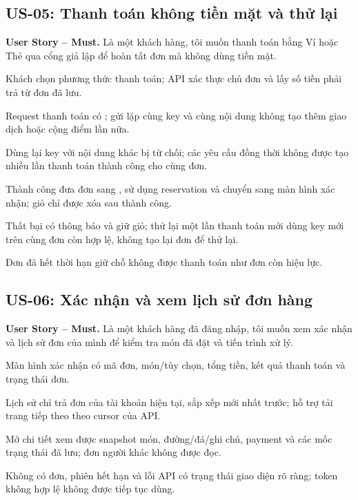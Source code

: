 \subsection{US-05: Thanh toán không tiền mặt và thử lại}
\label{us:05}
\noindent\textbf{User Story -- Must.}
Là một khách hàng, tôi muốn thanh toán bằng Ví hoặc Thẻ qua cổng giả lập
để hoàn tất đơn mà không dùng tiền mặt.
\begin{acceptance}
    \item Khách chọn phương thức thanh toán; API xác thực chủ đơn và lấy
    số tiền phải trả từ đơn đã lưu.
    \item Request thanh toán có ; gửi lặp cùng key
    và cùng nội dung không tạo thêm giao dịch hoặc cộng điểm lần nữa.
    \item Dùng lại key với nội dung khác bị từ chối; các yêu cầu đồng thời
    không được tạo nhiều lần thanh toán thành công cho cùng đơn.
    \item Thành công đưa đơn sang , sử dụng reservation và
    chuyển sang màn hình xác nhận; giỏ chỉ được xóa sau thành công.
    \item Thất bại có thông báo và giữ giỏ; thử lại một lần thanh toán
    mới dùng key mới trên cùng đơn còn hợp lệ, không tạo lại đơn để thử lại.
    \item Đơn đã hết thời hạn giữ chỗ không được thanh toán như đơn còn hiệu lực.
\end{acceptance}

\subsection{US-06: Xác nhận và xem lịch sử đơn hàng}
\label{us:06}
\noindent\textbf{User Story -- Must.}
Là một khách hàng đã đăng nhập, tôi muốn xem xác nhận và lịch sử đơn
của mình để kiểm tra món đã đặt và tiến trình xử lý.
\begin{acceptance}
    \item Màn hình xác nhận có mã đơn, món/tùy chọn, tổng tiền, kết quả
    thanh toán và trạng thái đơn.
    \item Lịch sử chỉ trả đơn của tài khoản hiện tại, sắp xếp mới nhất
    trước; hỗ trợ tải trang tiếp theo theo cursor của API.
    \item Mở chi tiết xem được snapshot món, đường/đá/ghi chú, payment
    và các mốc trạng thái đã lưu; đơn người khác không được đọc.
    \item Không có đơn, phiên hết hạn và lỗi API có trạng thái giao diện
    rõ ràng; token không hợp lệ không được tiếp tục dùng.
\end{acceptance}


